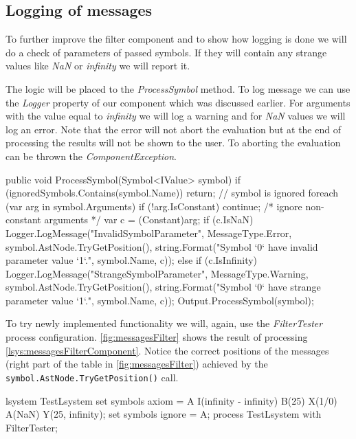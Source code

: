 \subsection{Logging of messages}

To further improve the filter component and to show how logging is done we will do a check of parameters of passed symbols.
If they will contain any strange values like \emph{NaN} or \emph{infinity} we will report it.

The logic will be placed to the \emph{ProcessSymbol} method.
To log message we can use the \emph{Logger} property of our component which was discussed earlier.
For arguments with the value equal to \emph{infinity} we will log a warning and for \emph{NaN} values we will log an error.
Note that the error will not abort the evaluation but at the end of processing the results will not be shown to the user.
To aborting the evaluation can be thrown the \emph{ComponentException}.

\begin{Csharp}
public void ProcessSymbol(Symbol<IValue> symbol) {
	if (ignoredSymbols.Contains(symbol.Name)) {
		return;  // symbol is ignored
	}
	foreach (var arg in symbol.Arguments) {
		if (!arg.IsConstant) { continue; /* ignore non-constant arguments */ }
		var c = (Constant)arg;
		if (c.IsNaN) {
			Logger.LogMessage("InvalidSymbolParameter", MessageType.Error,
				symbol.AstNode.TryGetPosition(),
				string.Format("Symbol `{0}` have invalid parameter value `{1}`.",
					symbol.Name, c));
		}
		else if (c.IsInfinity) {
			Logger.LogMessage("StrangeSymbolParameter", MessageType.Warning,
				symbol.AstNode.TryGetPosition(),
				string.Format("Symbol `{0}` have strange parameter value `{1}`.",	
					symbol.Name, c));
		}
	}
	Output.ProcessSymbol(symbol);
}
\end{Csharp}

To try newly implemented functionality we will, again, use the \emph{FilterTester} process configuration.
\autoref{fig:messagesFilter} shows the result of processing \autoref{lsys:messagesFilterComponent}.
Notice the correct positions of the messages (right part of the table in \autoref{fig:messagesFilter}) achieved by the \texttt{symbol.AstNode.TryGetPosition()} call.

\begin{Lsystem}[label=lsys:messagesFilterComponent,caption={\lsystem code for testing improved filter component}]
lsystem TestLsystem {
	set symbols axiom = A I(infinity - infinity) B(25)
		X(1/0) A(NaN) Y(25, infinity);
	set symbols ignore = A;
}
process TestLsystem with FilterTester;
\end{Lsystem}

